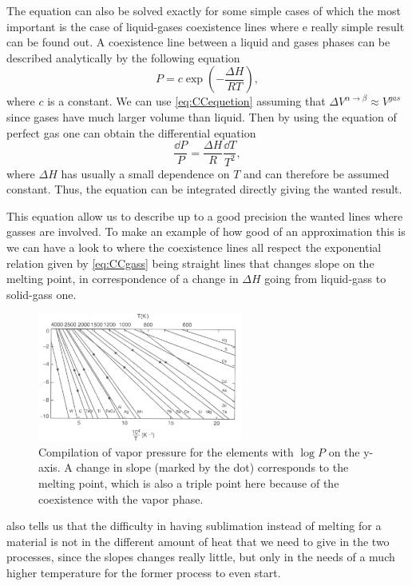 The equation can also be solved exactly for some simple cases of which the most important is the case of liquid-gases coexistence lines where e really simple result can be found out.
{
    A coexistence line between a liquid and gases phases can be described analytically by the following equation
    \begin{equation}
        \label{eq:CCgass}
        P = c\exp\left( -\frac{\Delta H}{RT} \right),
    \end{equation}
    where $c$ is a constant.
}
{
    We can use \eqref{eq:CCequetion} assuming that $\Delta V^{\alpha \to \beta} \approx V^{gas}$ since gases have much larger volume than liquid. Then by using the equation of perfect gas one can obtain the differential equation
    \begin{equation}
        \frac{\dd P}{P} = \frac{\Delta H}{R}\frac{\dd T}{T^2},
    \end{equation}
    where $\Delta H$ has usually a small dependence on $T$ and can therefore be assumed constant. Thus, the equation can be integrated directly giving the wanted result. 
}

\noindent
This equation allow us to describe up to a good precision the wanted lines where gasses are involved. To make an example of how good of an approximation this is we can have a look to  where the coexistence lines all respect the exponential relation given by \eqref{eq:CCgass} being straight lines that changes slope on the melting point, in correspondence of a change in $\Delta H$ going from liquid-gass to solid-gass one.
\begin{figure}[t]
    \centering
    \includegraphics[width=0.6\textwidth]{Immagini/CCexample.png}
    \caption{
        Compilation of vapor pressure for the elements with $\log P$ on the y-axis. A change in slope (marked by the dot) corresponds to the melting point, which is also a triple point here because of the coexistence with the vapor phase.
    }
    \label{fig:CCexample}
\end{figure}

\nt
{
     also tells us that the difficulty in having sublimation instead of melting for a material is not in the different amount of heat that we need to give in the two processes, since the slopes changes really little, but only in the needs of a much higher temperature for the former process to even start.
}
